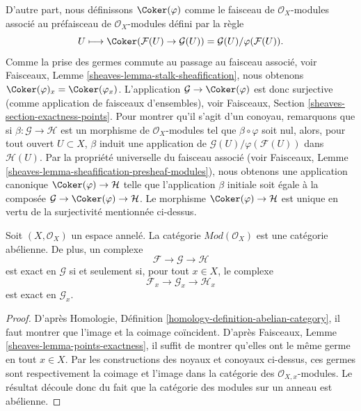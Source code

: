 \medskip\noindent
D'autre part, nous définissons $\Coker(\varphi)$ comme le faisceau de
$\mathcal{O}_X$-modules associé au préfaisceau de
$\mathcal{O}_X$-modules défini par la règle
$$
U
\longmapsto
\Coker(\mathcal{F}(U)\to \mathcal{G}(U)) =
\mathcal{G}(U)/\varphi(\mathcal{F}(U)).
$$
Comme la prise des germes commute au passage au faisceau associé, voir
Faisceaux, Lemme \ref{sheaves-lemma-stalk-sheafification}, nous obtenons
$\Coker(\varphi)_x = \Coker(\varphi_x)$. L'application
$\mathcal{G} \to \Coker(\varphi)$ est donc surjective (comme application de
faisceaux d'ensembles), voir Faisceaux, Section
\ref{sheaves-section-exactness-points}. Pour montrer qu'il s'agit d'un
conoyau, remarquons que si
$\beta : \mathcal{G} \to \mathcal{H}$ est un morphisme de
$\mathcal{O}_X$-modules tel que $\beta \circ \varphi$ soit nul, alors, pour
tout ouvert $U \subset X$, $\beta$ induit une application de
$\mathcal{G}(U)/\varphi(\mathcal{F}(U))$ dans $\mathcal{H}(U)$. Par la
propriété universelle du faisceau associé (voir Faisceaux, Lemme
\ref{sheaves-lemma-sheafification-presheaf-modules}), nous obtenons une
application canonique $\Coker(\varphi) \to \mathcal{H}$ telle que
l'application $\beta$ initiale soit égale à la composée
$\mathcal{G} \to \Coker(\varphi) \to \mathcal{H}$. Le morphisme
$\Coker(\varphi) \to \mathcal{H}$ est unique en vertu de la surjectivité
mentionnée ci-dessus.

\begin{lemma}
\label{lemma-abelian}
Soit $(X, \mathcal{O}_X)$ un espace annelé. La catégorie
$\textit{Mod}(\mathcal{O}_X)$ est une catégorie abélienne. De plus, un complexe
$$
\mathcal{F} \to \mathcal{G} \to \mathcal{H}
$$
est exact en $\mathcal{G}$ si et seulement si, pour tout $x \in X$, le complexe
$$
\mathcal{F}_x \to \mathcal{G}_x \to \mathcal{H}_x
$$
est exact en $\mathcal{G}_x$.
\end{lemma}

\begin{proof}
D'après Homologie, Définition \ref{homology-definition-abelian-category},
il faut montrer que l'image et la coimage coïncident. D'après Faisceaux,
Lemme \ref{sheaves-lemma-points-exactness}, il suffit de montrer qu'elles ont
le même germe en tout $x \in X$. Par les constructions des noyaux et conoyaux
ci-dessus, ces germes sont respectivement la coimage et l'image dans la
catégorie des $\mathcal{O}_{X, x}$-modules. Le résultat découle donc du fait
que la catégorie des modules sur un anneau est abélienne.
\end{proof}

